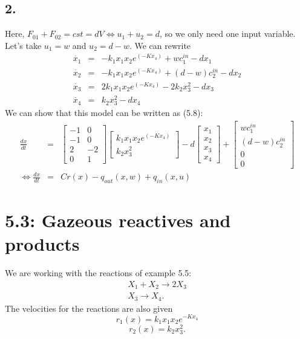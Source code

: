 \subsection*{2.}
Here, $F_{01}+F_{02} = cst = dV \Leftrightarrow u_1 + u_2 = d$, so we only need one input variable. Let's take $u_1=w$ and $u_2=d-w$. We can rewrite
\begin{eqnarray*}
\dot{x_1} &=& -k_1x_1x_2e^{(-Kx_4)} + w c_1^{in} - d x_1 \\
\dot{x_2} &=& -k_1x_1x_2e^{(-Kx_4)} + (d-w) c_2^{in} - dx_2 \\
\dot{x_3} &=& 2k_1x_1x_2e^{(-Kx_4)} - 2k_2x_3^2 - dx_3 \\
\dot{x_4} &=& k_2x_3^2 - dx_4
\end{eqnarray*}
We can show that this model can be written as (5.8):
\begin{eqnarray*}
\frac{dx}{dt} &=& \begin{bmatrix}
-1 & 0 \\
-1 & 0 \\
2 & -2 \\
0 & 1
\end{bmatrix}
\begin{bmatrix}
k_1x_1x_2e^{(-Kx_4)} \\
k_2x_3^2
\end{bmatrix} - d\begin{bmatrix}
x_1\\
x_2\\
x_3\\
x_4
\end{bmatrix} + \begin{bmatrix}
w c_1^{in} \\
(d-w) c_2^{in}\\
0\\
0
\end{bmatrix}  \\
\Leftrightarrow \frac{dx}{dt} &=& C r(x) - q_{out}(x,w) + q_{in}(x,u)
\end{eqnarray*}




\section*{5.3: Gazeous reactives and products}


We are working with the reactions of example 5.5:
\begin{eqnarray*}
X_1 + X_2 \rightarrow 2X_3 \\
X_3\rightarrow X_4.
\end{eqnarray*}
The velocities for the reactions are also given
$$r_{1}(x)=k_{1}x_{1}x_{2}e^{-Kx_{4}}$$
$$r_{2}(x)=k_{2}x_{3}^{2}.$$

